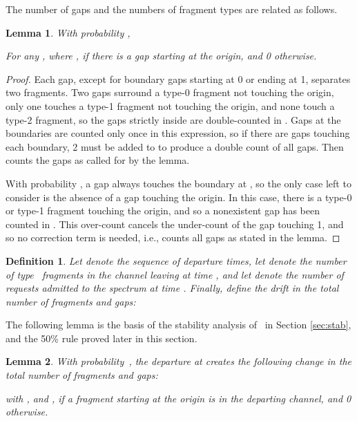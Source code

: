 \documentclass{amsart}
\newtheorem{defi}{Definition}
\newtheorem{lemma}{Lemma}
\begin{document}
The number  of gaps and the numbers of fragment types are related as
follows.
\begin{lemma} \label{lemma:comb}
    With probability ,
    
For any , where , if there is a gap starting at the
origin, and 0 otherwise.
\end{lemma}
\begin{proof} Each gap, except for boundary
gaps starting at 0 or ending at 1, separates two fragments.   Two
gaps surround a type-0 fragment not touching the origin, only one
touches a type-1 fragment not touching the origin, and none touch a
type-2 fragment, so the gaps strictly inside  are double-counted in . Gaps at the  boundaries are counted only once in this
expression, so if there are gaps touching each boundary, 2 must be
added to  to produce a double count of all gaps.
Then  counts the gaps as called for by the
lemma.

With probability , a gap always touches the boundary at , so the only
case left to consider is the absence of a gap touching the origin.
In this case, there is a type-0 or type-1 fragment touching the
origin, and so a nonexistent gap has been counted in .
This over-count cancels the under-count of the gap touching 1, and
so no correction term is needed, i.e.,  counts
all gaps as stated in the lemma.
\end{proof}
\begin{defi}
Let  denote the sequence of departure times, let 
denote the number of type~ fragments in the channel leaving at
time , and let  denote the number of requests admitted
to the spectrum at time .  Finally, define the {\em
drift} in the total number of fragments and gaps:

\end{defi}
The following lemma is the basis of the stability analysis
of~ in Section \ref{sec:stab}, and the 50\% rule proved later in
this section.
\begin{lemma}
\label{main} With probability~, the departure at  creates the
following change in the total number of fragments and gaps:

with , and  , if a fragment starting at the origin is
in the departing channel, and 0 otherwise.
\end{lemma}
\end{document}
